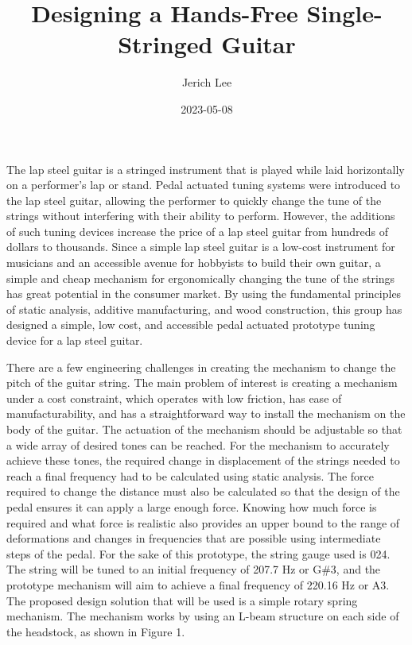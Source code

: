 \documentclass[12pt]{article}
\title{Designing a Hands-Free Single-Stringed Guitar}
\author{Jerich Lee}
\date{2023-05-08}
\theoremstyle{definition} %
\theoremstyle{plain} %
\begin{document}
\maketitle
The lap steel guitar is a stringed instrument that is played while laid horizontally on a
performer’s lap or stand. Pedal actuated tuning systems were introduced to the lap steel guitar,
allowing the performer to quickly change the tune of the strings without interfering with their ability
to perform. However, the additions of such tuning devices increase the price of a lap steel guitar
from hundreds of dollars to thousands. Since a simple lap steel guitar is a low-cost instrument for
musicians and an accessible avenue for hobbyists to build their own guitar, a simple and cheap
mechanism for ergonomically changing the tune of the strings has great potential in the consumer
market. By using the fundamental principles of static analysis, additive manufacturing, and wood
construction, this group has designed a simple, low cost, and accessible pedal actuated prototype
tuning device for a lap steel guitar.

There are a few engineering challenges in creating the mechanism to change the pitch of the
guitar string. The main problem of interest is creating a mechanism under a cost constraint, which
operates with low friction, has ease of manufacturability, and has a straightforward way to install the
mechanism on the body of the guitar. The actuation of the mechanism should be adjustable so that a
wide array of desired tones can be reached. For the mechanism to accurately achieve these tones, the
required change in displacement of the strings needed to reach a final frequency had to be calculated
using static analysis. The force required to change the distance must also be calculated so that the
design of the pedal ensures it can apply a large enough force. Knowing how much force is required
and what force is realistic also provides an upper bound to the range of deformations and changes in
frequencies that are possible using intermediate steps of the pedal. For the sake of this prototype,
the string gauge used is 024. The string will be tuned to an initial frequency of 207.7 Hz or G\#3, and
the prototype mechanism will aim to achieve a final frequency of 220.16 Hz or A3.
The proposed design solution that will be used is a simple rotary spring mechanism. The
mechanism works by using an L-beam structure on each side of the headstock, as shown in Figure 1.
\end{document}
